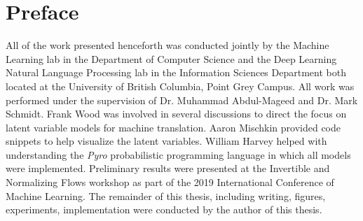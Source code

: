 
\chapter{Preface}

All of the work presented henceforth was conducted jointly by the Machine Learning lab in the Department of Computer Science and the Deep Learning Natural Language Processing lab in the Information Sciences Department both located at the University of British Columbia, Point Grey Campus. All work was performed under the supervision of Dr. Muhammad Abdul-Mageed and Dr. Mark Schmidt. Frank Wood was involved in several discussions to direct the focus on latent variable models for machine translation. Aaron Mischkin provided code snippets to help visualize the latent variables. William Harvey helped with understanding the \textit{Pyro} probabilistic programming language in which all models were implemented. Preliminary results were presented at the Invertible and Normalizing Flows workshop as part of the 2019 International Conference of Machine Learning. The remainder of this thesis, including writing, figures, experiments, implementation were conducted by the author of this thesis.


